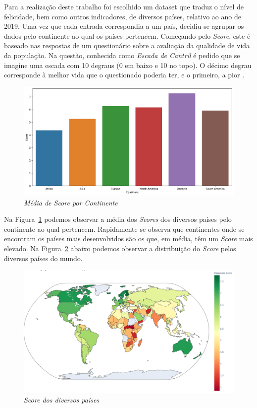 \documentclass[12pt, a4paper]{article}
\begin{document}
Para a realização deste trabalho foi escolhido um dataset que traduz o
nível de felicidade, bem como outros indicadores, de diversos países,
relativo ao ano de 2019. Uma vez que cada entrada correspondia a um
país, decidiu-se agrupar os dados pelo continente ao qual os países
pertencem. Começando pelo \emph{Score}, este
é baseado nas respostas de um questionário sobre a avaliação da
qualidade de vida da população. Na questão, conhecida como \emph{Escada
de Cantril} é pedido que se imagine uma escada com 10 degraus (0 em
baixo e 10 no topo). O décimo degrau corresponde à melhor vida que o
questionado poderia ter, e o primeiro, a pior \cite{kaggle}.

\begin{figure}[h]
\includegraphics[scale=0.45]{score_continents.pdf}
\centering
\caption{\emph{Média de Score por Continente}}
\label{fig:fig1}
\end{figure}

Na Figura~\ref{fig:fig1} podemos observar a média dos \emph{Scores} dos diversos
países pelo continente ao qual pertencem. Rapidamente se observa que
continentes onde se encontram os países mais desenvolvidos são os que,
em média, têm um \emph{Score} mais elevado. Na Figura~\ref{fig:fig2} abaixo podemos
observar a distribuição do \emph{Score} pelos diversos países do mundo.

\begin{figure}[h]
\includegraphics[scale=0.40]{score-worldmap.pdf}
\centering
\caption{\emph{Score dos diversos países}}
\label{fig:fig2}
\end{figure}
\end{document}

